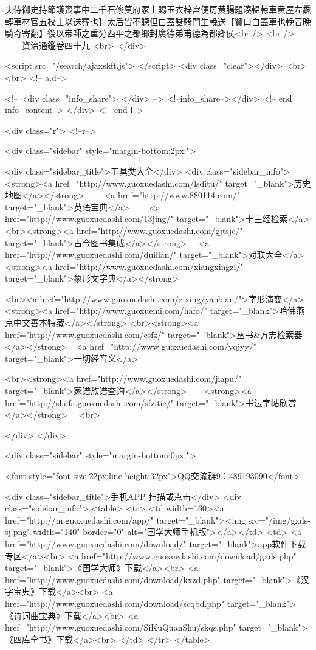 夫侍御史持節護喪事中二千石修莫府冢上賜玉衣梓宫便房黄腸題湊輼輬車黄屋左纛輕車材官五校士以送葬也】太后皆不聼但白蓋雙騎門生輓送【賢曰白蓋車也輓音晚騎奇寄翻】後以帝師之重分西平之都鄉封廣德弟甫德為都鄉侯<br />
<br />
　　資治通鑑卷四十九  <br>
   </div> 

<script src="/search/ajaxskft.js"> </script>
 <div class="clear"></div>
<br>
<br>
 <!-- a.d-->

 <!--
<div class="info_share">
</div> 
-->
 <!--info_share--></div>   <!-- end info_content-->
  </div> <!-- end l-->

<div class="r">   <!--r-->



<div class="sidebar"  style="margin-bottom:2px;">

 
<div class="sidebar_title">工具类大全</div>
<div class="sidebar_info">
<strong><a href="http://www.guoxuedashi.com/lsditu/" target="_blank">历史地图</a></strong>　　
<a href="http://www.880114.com/" target="_blank">英语宝典</a>　　
<a href="http://www.guoxuedashi.com/13jing/" target="_blank">十三经检索</a>　
<br><strong><a href="http://www.guoxuedashi.com/gjtsjc/" target="_blank">古今图书集成</a></strong>　
<a href="http://www.guoxuedashi.com/duilian/" target="_blank">对联大全</a>　<strong><a href="http://www.guoxuedashi.com/xiangxingzi/" target="_blank">象形文字典</a></strong>　

<br><a href="http://www.guoxuedashi.com/zixing/yanbian/">字形演变</a>　　<strong><a href="http://www.guoxuemi.com/hafo/" target="_blank">哈佛燕京中文善本特藏</a></strong>
<br><strong><a href="http://www.guoxuedashi.com/csfz/" target="_blank">丛书&方志检索器</a></strong>　<a href="http://www.guoxuedashi.com/yqjyy/" target="_blank">一切经音义</a>　　

<br><strong><a href="http://www.guoxuedashi.com/jiapu/" target="_blank">家谱族谱查询</a></strong>　　<strong><a href="http://shufa.guoxuedashi.com/sfzitie/" target="_blank">书法字帖欣赏</a></strong>　
<br>

</div>
</div>


<div class="sidebar" style="margin-bottom:0px;">

<font style="font-size:22px;line-height:32px">QQ交流群9：489193090</font>


<div class="sidebar_title">手机APP 扫描或点击</div>
<div class="sidebar_info">
<table>
<tr>
	<td width=160><a href="http://m.guoxuedashi.com/app/" target="_blank"><img src="/img/gxds-sj.png" width="140"  border="0" alt="国学大师手机版"></a></td>
	<td>
<a href="http://www.guoxuedashi.com/download/" target="_blank">app软件下载专区</a><br>
<a href="http://www.guoxuedashi.com/download/gxds.php" target="_blank">《国学大师》下载</a><br>
<a href="http://www.guoxuedashi.com/download/kxzd.php" target="_blank">《汉字宝典》下载</a><br>
<a href="http://www.guoxuedashi.com/download/scqbd.php" target="_blank">《诗词曲宝典》下载</a><br>
<a href="http://www.guoxuedashi.com/SiKuQuanShu/skqs.php" target="_blank">《四库全书》下载</a><br>
</td>
</tr>
</table>

